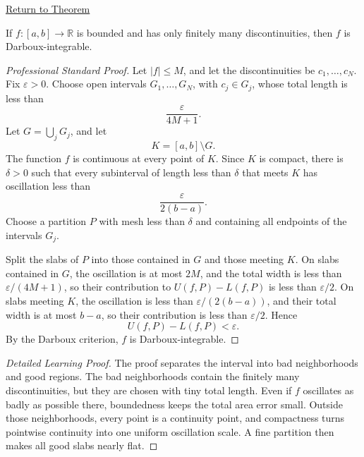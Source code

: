 \newpage
{}
\label{prf:finite-discontinuities-darboux-integrable}
\begin{remark*}[Return]\hyperref[thm:finite-discontinuities-darboux-integrable]{Return to Theorem}\end{remark*}
\begin{theorem*}
If \(f:[a,b]\to\mathbb R\) is bounded and has only finitely many
discontinuities, then \(f\) is Darboux-integrable.
\end{theorem*}
\begin{proof}[Professional Standard Proof]
\LRAProofBodyStart
Let \(|f|\le M\), and let the discontinuities be \(c_1,\ldots,c_N\). Fix
\(\varepsilon>0\). Choose open intervals \(G_1,\ldots,G_N\), with
\(c_j\in G_j\), whose total length is less than
\[
  \frac{\varepsilon}{4M+1}.
\]
Let \(G=\bigcup_jG_j\), and let
\[
  K=[a,b]\setminus G.
\]
The function \(f\) is continuous at every point of \(K\). Since \(K\) is
compact, there is \(\delta>0\) such that every subinterval of length less than
\(\delta\) that meets \(K\) has oscillation less than
\[
  \frac{\varepsilon}{2(b-a)}.
\]
Choose a partition \(P\) with mesh less than \(\delta\) and containing all
endpoints of the intervals \(G_j\).

Split the slabs of \(P\) into those contained in \(G\) and those meeting
\(K\). On slabs contained in \(G\), the oscillation is at most \(2M\), and the
total width is less than \(\varepsilon/(4M+1)\), so their contribution to
\(U(f,P)-L(f,P)\) is less than \(\varepsilon/2\). On slabs meeting \(K\), the
oscillation is less than \(\varepsilon/(2(b-a))\), and their total width is at
most \(b-a\), so their contribution is less than \(\varepsilon/2\). Hence
\[
  U(f,P)-L(f,P)<\varepsilon.
\]
By the Darboux criterion, \(f\) is Darboux-integrable.
\end{proof}
\begin{proof}[Detailed Learning Proof]
\LRAProofBodyStart
The proof separates the interval into bad neighborhoods and good regions. The
bad neighborhoods contain the finitely many discontinuities, but they are
chosen with tiny total length. Even if \(f\) oscillates as badly as possible
there, boundedness keeps the total area error small. Outside those
neighborhoods, every point is a continuity point, and compactness turns
pointwise continuity into one uniform oscillation scale. A fine partition then
makes all good slabs nearly flat.
\end{proof}
